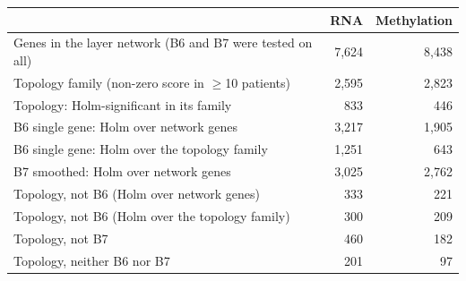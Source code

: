 \begin{tabular}{lrr}
\toprule
 & RNA & Methylation \\
\midrule
Genes in the layer network (B6 and B7 were tested on all) & 7,624 & 8,438 \\
Topology family (non-zero score in $\ge$10 patients) & 2,595 & 2,823 \\
Topology: Holm-significant in its family & 833 & 446 \\
B6 single gene: Holm over network genes & 3,217 & 1,905 \\
B6 single gene: Holm over the topology family & 1,251 & 643 \\
B7 smoothed: Holm over network genes & 3,025 & 2,762 \\
\midrule
Topology, not B6 (Holm over network genes) & 333 & 221 \\
Topology, not B6 (Holm over the topology family) & 300 & 209 \\
Topology, not B7 & 460 & 182 \\
Topology, neither B6 nor B7 & 201 & 97 \\
\bottomrule
\end{tabular}
